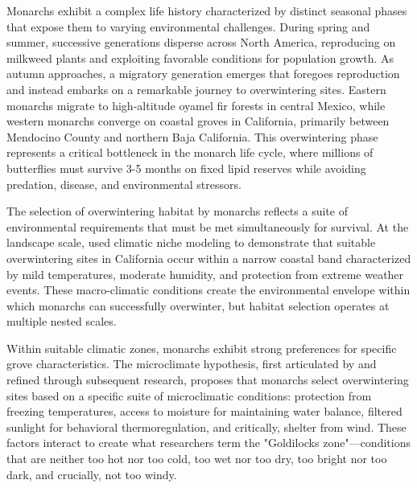 Monarchs exhibit a complex life history characterized by distinct seasonal phases that expose them to varying environmental challenges. During spring and summer, successive generations disperse across North America, reproducing on milkweed plants and exploiting favorable conditions for population growth. As autumn approaches, a migratory generation emerges that foregoes reproduction and instead embarks on a remarkable journey to overwintering sites. Eastern monarchs migrate to high-altitude oyamel fir forests in central Mexico, while western monarchs converge on coastal groves in California, primarily between Mendocino County and northern Baja California. This overwintering phase represents a critical bottleneck in the monarch life cycle, where millions of butterflies must survive 3-5 months on fixed lipid reserves while avoiding predation, disease, and environmental stressors.


The selection of overwintering habitat by monarchs reflects a suite of environmental requirements that must be met simultaneously for survival. At the landscape scale, \citet{fisherClimaticNicheModel2018} used climatic niche modeling to demonstrate that suitable overwintering sites in California occur within a narrow coastal band characterized by mild temperatures, moderate humidity, and protection from extreme weather events. These macro-climatic conditions create the environmental envelope within which monarchs can successfully overwinter, but habitat selection operates at multiple nested scales.

Within suitable climatic zones, monarchs exhibit strong preferences for specific grove characteristics. The microclimate hypothesis, first articulated by \citet{leongMicroenvironmentalFactorsAssociated1990a} and refined through subsequent research, proposes that monarchs select overwintering sites based on a specific suite of microclimatic conditions: protection from freezing temperatures, access to moisture for maintaining water balance, filtered sunlight for behavioral thermoregulation, and critically, shelter from wind. These factors interact to create what researchers term the "Goldilocks zone"---conditions that are neither too hot nor too cold, too wet nor too dry, too bright nor too dark, and crucially, not too windy.

